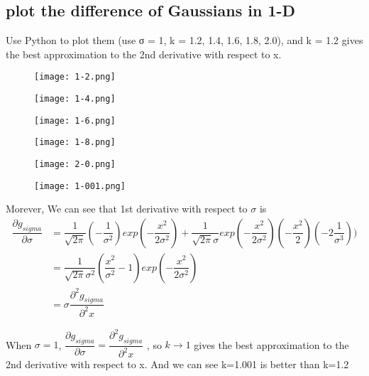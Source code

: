 \documentclass[a4paper,UTF8,11pt]{article}
\numberwithin{equation}{section}
\begin{document}
\subsection{plot the difference of Gaussians in 1-D}	
Use Python to plot them (use σ = 1, k = 1.2, 1.4, 1.6, 1.8, 2.0), and k = 1.2 gives the best approximation to the 2nd derivative with respect to x.
\begin{figure}[h]
\centering
\begin{minipage}[t]{0.48\textwidth}
\centering
\texttt{[image: 1-2.png]}
\end{minipage}
\begin{minipage}[t]{0.48\textwidth}
\centering
\texttt{[image: 1-4.png]}
\end{minipage}

\centering
\begin{minipage}[t]{0.48\textwidth}
\centering
\texttt{[image: 1-6.png]}
\end{minipage}
\begin{minipage}[t]{0.48\textwidth}
\centering
\texttt{[image: 1-8.png]}
\end{minipage}

\centering
\begin{minipage}[t]{0.48\textwidth}
\centering
\texttt{[image: 2-0.png]}
\end{minipage}
\begin{minipage}[t]{0.48\textwidth}
\centering
\texttt{[image: 1-001.png]}
\end{minipage}
\end{figure}

Morever, We can see that 1st derivative with respect to $\sigma $ is
\begin{align*}
\dfrac{\partial g_{sigma}}{\partial \sigma} &= \dfrac{1}{\sqrt{2\pi}}(-\dfrac{1}{\sigma^2})exp(-\dfrac{x^2}{2\sigma^2})+\dfrac{1}{\sqrt{2\pi}\sigma}exp(-\dfrac{x^2}{2\sigma^2})(-\dfrac{x^2}{2})(-2\dfrac{1}{\sigma^3}))\\
&=\dfrac{1}{\sqrt{2\pi}\sigma^2}(\dfrac{x^2}{\sigma^2}-1)exp(-\dfrac{x^2}{2\sigma^2})\\
&=\sigma  \dfrac{\partial^2 g_{sigma}}{\partial^2 x}  
\end{align*}

When $\sigma = 1$, $\dfrac{\partial g_{sigma}}{\partial \sigma}=\dfrac{\partial^2 g_{sigma}}{\partial^2 x}  $ , so $k\rightarrow 1 $ gives the best approximation to the 2nd derivative with respect to x. And we can see k=1.001 is better than k=1.2
\end{document}
